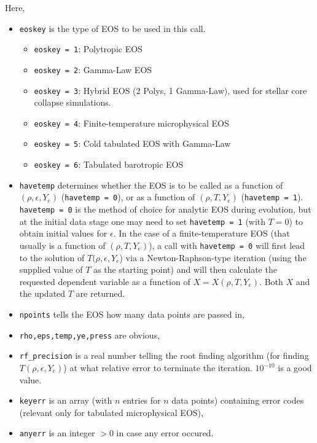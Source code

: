 Here, 
\begin{itemize}
\item \texttt{eoskey} is the type of EOS to be used in this call.
  \begin{itemize}
    \item \texttt{eoskey = 1}: Polytropic EOS
    \item \texttt{eoskey = 2}: Gamma-Law EOS
    \item \texttt{eoskey = 3}: Hybrid EOS (2 Polys, 1 Gamma-Law), used
      for stellar core collapse simulations.
    \item \texttt{eoskey = 4}: Finite-temperature microphysical EOS
    \item \texttt{eoskey = 5}: Cold tabulated EOS with Gamma-Law
    \item \texttt{eoskey = 6}: Tabulated barotropic EOS
  \end{itemize}
\item \texttt{havetemp} determines whether the EOS is to be called as
  a function of $(\rho,\epsilon,Y_e)$ (\texttt{havetemp = 0}), or as a
  function of $(\rho,T,Y_e)$ (\texttt{havetemp = 1}).
  \texttt{havetemp = 0} is the method of choice for analytic EOS during
  evolution, but at the initial data stage one may need to set
  \texttt{havetemp = 1} (with $T=0$) to obtain initial values for
  $\epsilon$.  In the case of a finite-temperature EOS (that usually
  is a function of $(\rho,T,Y_e)$), a call with \texttt{havetemp = 0}
  will first lead to the solution of $T(\rho,\epsilon,Y_e$) via a
  Newton-Raphson-type iteration (using the supplied value of $T$ as
  the starting point) and will then calculate the requested dependent
  variable as a function of $X=X(\rho,T,Y_e)$. Both $X$ and the updated
  $T$ are returned.

\item \texttt{npoints} tells the EOS how many data points are passed
  in,
\item \texttt{rho,eps,temp,ye,press} are obvious,
\item \texttt{rf\_precision} is a real number telling the root finding
  algorithm (for finding $T(\rho,\epsilon,Y_e)$) at what relative error
  to terminate the iteration. $10^{-10}$ is a good value.
\item \texttt{keyerr} is an array (with $n$ entries for $n$ data
  points) containing error codes (relevant only for tabulated
  microphysical EOS),
\item \texttt{anyerr} is an integer $>0$ in case
  any error occured.
\end{itemize}

